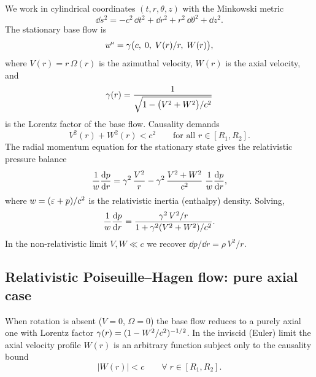 We work in cylindrical coordinates $(t,r,\theta,z)$ with the
Minkowski metric
\begin{equation}
\label{eq:rel-8-200}
\dd s^{2} = -c^{2}\,\dd t^{2} + \dd r^{2} + r^{2}\,\dd\theta^{2}
           + \dd z^{2}.
\end{equation}
The stationary base flow is
\begin{equation}
\label{eq:rel-8-201}
u^{\mu} = \gamma\bigl(c,\;0,\;V(r)/r,\;W(r)\bigr),
\end{equation}
where $V(r)=r\,\Omega(r)$ is the azimuthal velocity, $W(r)$ is the
axial velocity, and
\begin{equation}
\label{eq:rel-8-202}
\gamma(r) = \frac{1}{\sqrt{1 - \bigl(V^{2}+W^{2}\bigr)/c^{2}}}
\end{equation}
is the Lorentz factor of the base flow.  Causality demands
\begin{equation}
\label{eq:rel-8-203}
V^{2}(r) + W^{2}(r) < c^{2} \qquad \text{for all } r\in[R_{1},R_{2}].
\end{equation}
The radial momentum equation for the stationary state gives the
relativistic pressure balance
\begin{equation}
\label{eq:rel-8-204}
\frac{1}{w}\frac{\mathrm{d} p}{\mathrm{d} r}
  = \gamma^{2}\,\frac{V^{2}}{r}
  - \gamma^{2}\,\frac{V^{2}+W^{2}}{c^{2}}\;\frac{1}{w}
    \frac{\mathrm{d} p}{\mathrm{d} r},
\end{equation}
where $w = (\varepsilon+p)/c^{2}$ is the relativistic
inertia (enthalpy) density.  Solving,
\begin{equation}
\label{eq:rel-8-205}
\frac{1}{w}\frac{\mathrm{d} p}{\mathrm{d} r}
  = \frac{\gamma^{2}\,V^{2}/r}
         {1 + \gamma^{2}(V^{2}+W^{2})/c^{2}}.
\end{equation}
In the non-relativistic limit $V,W\ll c$ we recover
$\dd p/\dd r = \rho\,V^{2}/r$.

\subsection{Relativistic Poiseuille--Hagen flow: pure axial case}
\label{sec:rel-8-79b}

When rotation is absent ($V=0$, $\Omega=0$) the base flow reduces to
a purely axial one with Lorentz factor
$\gamma(r) = (1-W^{2}/c^{2})^{-1/2}$.  In the inviscid (Euler) limit
the axial velocity profile $W(r)$ is an arbitrary function subject
only to the causality bound
\begin{equation}
\label{eq:rel-8-206}
|W(r)| < c \qquad \forall\; r\in[R_{1},R_{2}].
\end{equation}

